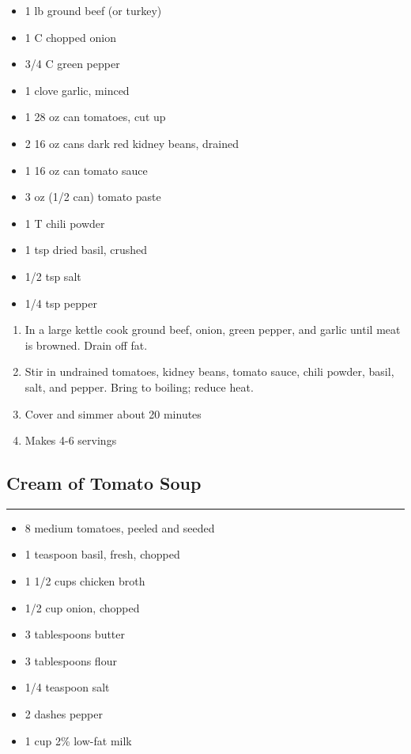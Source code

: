 \documentclass{article}
\begin{document}
\begin{framed}
    \begin{itemize}
        \item 1 lb ground beef (or turkey)
        \item 1 C chopped onion
        \item 3/4 C green pepper
        \item 1 clove garlic, minced
        \item 1 28 oz can tomatoes, cut up
        \item 2 16 oz cans dark red kidney beans, drained
        \item 1 16 oz can tomato sauce
        \item 3 oz (1/2 can) tomato paste
        \item 1 T chili powder
        \item 1 tsp dried basil, crushed
        \item 1/2 tsp salt
        \item 1/4 tsp pepper
    \end{itemize}
\end{framed}

\begin{enumerate}
    \item
        In a large kettle cook ground beef, onion, green pepper, and garlic until meat is browned. Drain off fat.
    \item
        Stir in undrained tomatoes, kidney beans, tomato sauce, chili powder, basil, salt, and pepper. Bring to boiling; reduce heat.
    \item
        Cover and simmer about 20 minutes
    \item
        Makes 4-6 servings
\end{enumerate}
\newpage

\subsection{Cream of Tomato Soup} 
\noindent\rule[0.5ex]{\linewidth}{1pt}

\begin{framed}
\begin{itemize}
    \item 8 medium tomatoes, peeled and seeded
    \item 1 teaspoon basil, fresh, chopped
    \item 1 1/2 cups chicken broth
    \item 1/2 cup onion, chopped
    \item 3 tablespoons butter
    \item 3 tablespoons flour
    \item 1/4 teaspoon salt
    \item 2 dashes pepper
    \item 1 cup 2\% low-fat milk
\end{itemize}
\end{framed}
\end{document}

